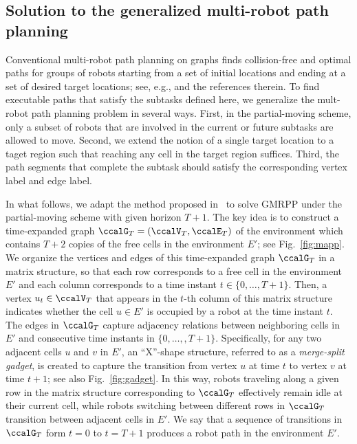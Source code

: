 \documentclass[Afour,sageh,times]{sagej}
\begin{document}
{{\subsection{Solution to the generalized multi-robot path planning}\label{sec:solution2mapp}

{ Conventional multi-robot path planning on graphs finds collision-free and optimal paths for groups of robots starting from a set of initial locations and ending at a set of desired target locations; see, e.g., \cite{yu2016optimal} and the references therein. To find executable paths that satisfy the subtasks defined here, we generalize the mult-robot path planning problem in several ways. First, in the partial-moving scheme,  only a subset of robots that are involved in the current or future subtasks are allowed to move.  Second, we extend the notion of a single target location to a taget region such that reaching any cell in the target region suffices. Third, the path segments that complete the  subtask should satisfy the corresponding vertex label and edge label.


  In what follows, we adapt the method proposed in~\cite{yu2016optimal} to solve GMRPP under the partial-moving scheme with given horizon $T+1$.   The key idea is to construct a time-expanded graph $\ccalG_T = (\ccalV_T, \ccalE_T)$ of the environment which contains $T+2$ copies of the free cells in the environment $E'$; see Fig.~\ref{fig:mapp}. We organize the vertices and edges of this time-expanded graph $\ccalG_T$ in a matrix structure, so that each row corresponds to a free cell in the environment $E'$ and each column corresponds to a time instant $t\in \{0,\ldots,T+1\}$. Then, a vertex $u_t \in \ccalV_T$ that appears in the $t$-th column of this matrix structure indicates whether the cell $u\in E'$ is occupied by a robot at the time instant $t$. The edges in $\ccalG_T$ capture  adjacency relations between neighboring cells in $E'$ and consecutive time instants in $\{0,\ldots,,T+1\}$. Specifically, for any two adjacent cells $u$ and $v$ in $E'$, an ``X''-shape structure, referred to as a {\it merge-split gadget}, is created to capture the transition from vertex $u$ at time $t$ to vertex $v$ at time $t+1$; see also Fig.~\ref{fig:gadget}. In this way, robots traveling along a given row in the matrix structure corresponding to $\ccalG_T$ effectively remain idle at their current cell, while robots switching between different rows in $\ccalG_T$ transition between adjacent cells in $E'$. We say that a sequence of transitions in $\ccalG_T$ form $t=0$ to $t=T+1$ produces a robot path in the environment $E'$.

}}}
\end{document}
